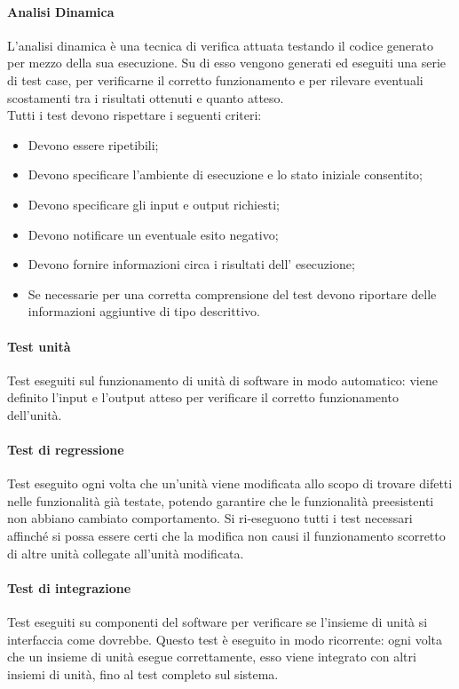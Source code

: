 			\paragraph{Analisi Dinamica}
				L’analisi dinamica è una tecnica di verifica attuata testando il codice generato per mezzo della sua esecuzione. Su di esso vengono generati ed eseguiti una serie di test case, per verificarne il corretto funzionamento e per rilevare eventuali scostamenti tra i risultati ottenuti e quanto atteso. \\
				Tutti i test devono rispettare i seguenti criteri: \\
				\begin{itemize}
					\item Devono essere ripetibili;
					\item Devono specificare l’ambiente di esecuzione e lo stato iniziale consentito;
					\item Devono specificare gli input e output richiesti;
					\item Devono notificare un eventuale esito negativo;
					\item Devono fornire informazioni circa i risultati dell’ esecuzione;
					\item Se necessarie per una corretta comprensione del test devono riportare delle informazioni aggiuntive di tipo descrittivo.
				\end{itemize}
				\paragraph{Test unità}
					Test eseguiti sul funzionamento di unità di software in modo automatico: viene definito l'input e l'output atteso per verificare il corretto funzionamento dell'unità.\\
				\paragraph{Test di regressione}
					Test eseguito ogni volta che un'unità viene modificata allo scopo di trovare difetti nelle funzionalità già testate, potendo garantire che le funzionalità preesistenti non abbiano cambiato comportamento. Si ri-eseguono tutti i test necessari affinché si possa essere certi che la modifica non causi il funzionamento scorretto di altre unità collegate all'unità modificata.\\
				\paragraph{Test di integrazione}
					Test eseguiti su componenti del software per verificare se l'insieme di unità si interfaccia come dovrebbe. Questo test è eseguito in modo ricorrente: ogni volta che un insieme di unità esegue correttamente, esso viene integrato con altri insiemi di unità, fino al test completo sul sistema.\\
